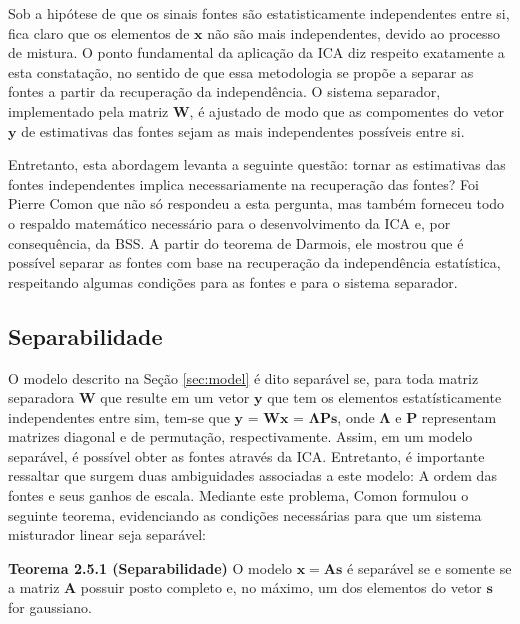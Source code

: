     Sob a hipótese de que os sinais fontes são estatisticamente independentes entre si, fica claro que os elementos de $\mathbf{x}$ não são mais independentes, devido ao processo de mistura. O ponto fundamental da aplicação da ICA diz respeito exatamente a esta constatação, no sentido de que essa metodologia se propõe a separar as fontes a partir da recuperação da independência. O sistema separador, implementado pela matriz $\mathbf{W}$, é ajustado de modo que as compomentes do vetor $\mathbf{y}$ de estimativas das fontes sejam as mais independentes possíveis entre si.
    
    Entretanto, esta abordagem levanta a seguinte questão: tornar as estimativas das fontes independentes implica necessariamente na recuperação das fontes? Foi Pierre Comon \cite{Comon} que não só respondeu a esta pergunta, mas também forneceu todo o respaldo matemático necessário para o desenvolvimento da ICA e, por consequência, da BSS.
    A partir do teorema de Darmois, ele mostrou que é possível separar as fontes com base na recuperação da independência estatística, respeitando algumas condições para as fontes e para o sistema separador.

\subsection{Separabilidade}\label{sec:separability}

    O modelo descrito na Seção \ref{sec:model} é dito separável se, para toda matriz separadora $\mathbf{W}$ que resulte em um vetor $\mathbf{y}$ que tem os elementos estatísticamente independentes entre sim, tem-se que $\mathbf{y}$ = $\mathbf{Wx}$ = $\mathbf{\Lambda P s}$, onde $\mathbf{\Lambda}$ e $\mathbf{P}$ representam matrizes diagonal e de permutação, respectivamente. Assim, em um modelo separável, é possível obter as fontes através da ICA. Entretanto, é importante ressaltar que surgem duas ambiguidades associadas a este modelo: A ordem das fontes e seus ganhos de escala. Mediante este problema, Comon \cite{Comon} formulou o seguinte teorema, evidenciando as condições necessárias para que um sistema misturador linear seja separável:
    
    \bigskip
    
    \textbf{Teorema 2.5.1 (Separabilidade)} O modelo $\mathbf{x} = \mathbf{As}$ é separável se e somente se a matriz $\mathbf{A}$ possuir posto completo e, no máximo, um dos elementos do vetor $\mathbf{s}$ for gaussiano.
    
    \bigskip
    
